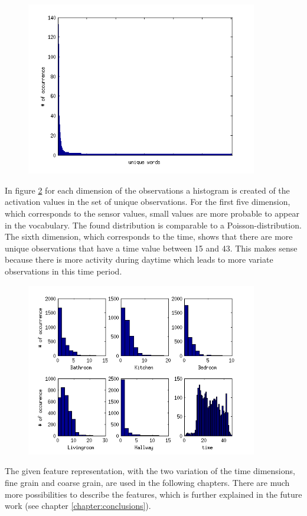 \begin{figure}[h]
 \centering
 \includegraphics[width=0.9\textwidth]{Pictures/OccurenceFineGrain.png}
 \caption{}
 \label{fig:occurence}
\end{figure}


In figure \ref{fig:FieldDistr} for each dimension of the observations a histogram is created of the activation values in the set of unique observations. For the first five dimension, which corresponds to the sensor values, small values are more probable to appear in the vocabulary. The found distribution is comparable to a Poisson-distribution. The sixth dimension, which corresponds to the time, shows that there are more unique observations that have a time value between 15 and 43. This makes sense because there is more activity during daytime which leads to more variate observations in this time period.\\


\begin{figure}[h]
 \centering
 \includegraphics[width=0.9\textwidth]{Pictures/OccField2.png}
 \caption{}
 \label{fig:FieldDistr}
\end{figure}

The given feature representation, with the two variation of the time dimensions, fine grain and coarse grain, are used in the following chapters. There are much more possibilities to describe the features, which is further explained in the future work (see chapter \ref{chapter:conclusions}).

